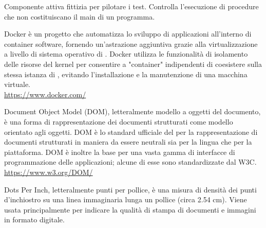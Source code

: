 Componente attiva fittizia per pilotare i test. Controlla l’esecuzione di procedure che non costituiscano il main di un programma.

Docker è un progetto  che automatizza lo sviluppo di applicazioni all'interno di container software, fornendo un'astrazione aggiuntiva grazie alla virtualizzazione a livello di sistema operativo di . Docker utilizza le funzionalità di isolamento delle risorse del kernel  per consentire a "container" indipendenti di coesistere sulla stessa istanza di , evitando l'installazione e la manutenzione di una macchina virtuale.\\
\url{https://www.docker.com/}

Document Object Model (DOM), letteralmente modello a oggetti del documento, è una forma di rappresentazione dei documenti strutturati come modello orientato agli oggetti.
DOM è lo standard ufficiale del  per la rappresentazione di documenti strutturati in maniera da essere neutrali sia per la lingua che per la piattaforma. DOM è inoltre la base per una vasta gamma di interfacce di programmazione delle applicazioni; alcune di esse sono standardizzate dal W3C.\\
\url{https://www.w3.org/DOM/}

Dots Per Inch, letteralmente punti per pollice, è una misura di densità dei punti d'inchiostro su una linea immaginaria lunga un pollice (circa 2.54 cm). Viene usata principalmente per indicare la qualità di stampa di documenti e immagini in formato digitale.
\clearpage
